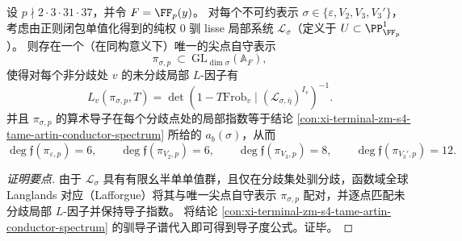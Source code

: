 \begin{conclusion}\label{con:xi-terminal-zm-s4-function-field-langlands-artin-components}
设 \(p\nmid 2\cdot 3\cdot 31\cdot 37\)，并令 \(F=\FF_p(y)\)。
对每个不可约表示 \(\sigma\in\{\varepsilon,V_2,V_3,V_3'\}\)，考虑由正则闭包单值化得到的纯权 \(0\) 驯 lisse 局部系统 \(\mathcal L_\sigma\)（定义于 \(U\subset\PP^1_{\FF_p}\)）。
则存在一个（在同构意义下）唯一的尖点自守表示
\[
\pi_{\sigma,p}\ \subset\ \mathrm{GL}_{\dim\sigma}(\mathbb A_F),
\]
使得对每个非分歧处 \(v\) 的未分歧局部 \(L\)-因子有
\[
L_v(\pi_{\sigma,p},T)
=
\det\!\left(1-T\mathrm{Frob}_v\mid (\mathcal L_{\sigma,\bar\eta})^{I_v}\right)^{-1}.
\]
并且 \(\pi_{\sigma,p}\) 的算术导子在每个分歧点处的局部指数等于结论 \ref{con:xi-terminal-zm-s4-tame-artin-conductor-spectrum} 所给的 \(a_b(\sigma)\)，从而
\[
\deg\mathfrak f(\pi_{\varepsilon,p})=6,\qquad
\deg\mathfrak f(\pi_{V_2,p})=6,\qquad
\deg\mathfrak f(\pi_{V_3,p})=8,\qquad
\deg\mathfrak f(\pi_{V_3',p})=12.
\]
\end{conclusion}
\begin{proof}[证明要点]
由于 \(\mathcal L_\sigma\) 具有有限幺半单单值群，且仅在分歧集处驯分歧，函数域全球 Langlands 对应（Lafforgue）将其与唯一尖点自守表示 \(\pi_{\sigma,p}\) 配对，并逐点匹配未分歧局部 \(L\)-因子并保持导子指数。
将结论 \ref{con:xi-terminal-zm-s4-tame-artin-conductor-spectrum} 的驯导子谱代入即可得到导子度公式。证毕。\cite{LafforgueGlobalLanglandsFunctionFields}
\end{proof}

